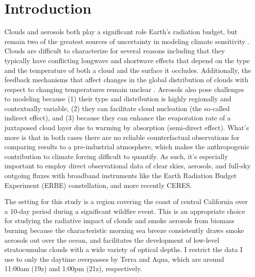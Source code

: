 \documentclass[12pt]{article}
\begin{document}

\section{Introduction}

    Clouds and aerosols both play a significant role Earth's radiation budget, but remain two of the greatest sources of uncertainty in modeling climate sensitivity \cite{masson-delmotte_climate_2021}. Clouds are difficult to characterize for several reasons including that they typically have conflicting longwave and shortwave effects that depend on the type and the temperature of both a cloud and the surface it occludes. Additionally, the feedback mechanisms that affect changes in the global distribution of clouds with respect to changing temperatures remain unclear \cite{ramanathan_cloud-radiative_1989}. Aerosols also pose challenges to modeling because (1) their type and distribution is highly regionally and contextually variable, (2) they can facilitate cloud nucleation (the so-called indirect effect), and (3) because they can enhance the evaporation rate of a juxtaposed cloud layer due to warming by absorption (semi-direct effect)\cite{kaufman_satellite_2002}. What's more is that in both cases there are no reliable counterfactual observations for comparing results to a pre-industrial atmosphere, which makes the anthropogenic contribution to climate forcing difficult to quantify. As such, it's especially important to employ direct observational data of clear skies, aerosols, and full-sky outgoing fluxes with broadband instruments like the Earth Radiation Budget Experiment (ERBE) constellation, and more recently CERES.

    The setting for this study is a region covering the coast of central California over a 10-day period during a significant wildfire event. This is an appropriate choice for studying the radiative impact of clouds and smoke aerosols from biomass burning because the characteristic morning sea breeze consistently draws smoke aerosols out over the ocean, and facilitates the development of low-level stratocumulus clouds with a wide variety of optical depths. I restrict the data I use to only the daytime overpasses by Terra and Aqua, which are around 11:00am (19z) and 1:00pm (21z), respectively.
\end{document}
